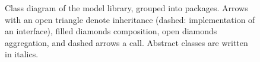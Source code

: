 \begin{figure}[H]
    \centering
    
    \caption{Class diagram of the model library, grouped into packages.
    Arrows with an open triangle denote inheritance (dashed: implementation of
    an interface), filled diamonds composition, open diamonds aggregation, and
    dashed arrows a call. Abstract classes are written in italics.}
    \label{fig:class_design}
\end{figure}

